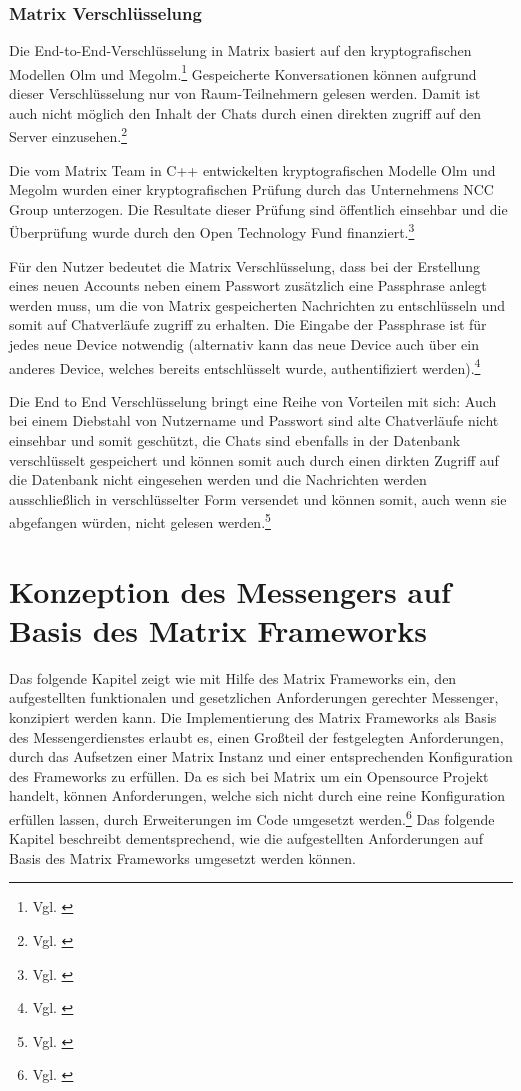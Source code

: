 \subsubsection{Matrix Verschlüsselung}\label{chapter:aemn}
Die End-to-End-Verschlüsselung in Matrix basiert auf den kryptografischen Modellen Olm und Megolm.\footnote{Vgl. \cite{Chishtie2018}}
Gespeicherte Konversationen können aufgrund dieser Verschlüsselung nur von Raum-Teilnehmern gelesen werden. Damit ist auch nicht möglich den Inhalt der Chats durch einen direkten zugriff auf den Server einzusehen.\footnote{Vgl. \cite{Nccgroup2016}}

Die vom Matrix  Team in C++ entwickelten kryptografischen Modelle Olm und Megolm  wurden einer kryptografischen Prüfung durch das Unternehmens NCC Group unterzogen. Die Resultate dieser Prüfung sind öffentlich einsehbar und die Überprüfung wurde durch den Open Technology Fund finanziert.\footnote{Vgl. \cite{Nccgroup2016}}

Für den Nutzer bedeutet die Matrix Verschlüsselung, dass bei der Erstellung eines neuen Accounts neben einem Passwort zusätzlich eine Passphrase anlegt werden muss, um die von Matrix gespeicherten Nachrichten zu entschlüsseln und somit auf Chatverläufe zugriff zu erhalten.
Die Eingabe der Passphrase ist für jedes neue Device notwendig (alternativ kann das neue Device auch über ein anderes Device, welches bereits entschlüsselt wurde, authentifiziert werden).\footnote{Vgl. \cite{Chishtie2018}}

Die End to End Verschlüsselung bringt eine Reihe von Vorteilen mit sich: Auch bei einem Diebstahl von Nutzername und Passwort sind alte Chatverläufe nicht einsehbar und somit geschützt, die Chats sind ebenfalls in der Datenbank verschlüsselt gespeichert und können somit auch durch einen dirkten Zugriff auf die Datenbank nicht eingesehen werden und die Nachrichten werden ausschließlich in verschlüsselter Form versendet und können somit, auch wenn sie abgefangen würden, nicht gelesen werden.\footnote{Vgl. \cite{Chishtie2018}}

\section{Konzeption des Messengers auf Basis des Matrix Frameworks}\label{chapter:km}
Das folgende Kapitel zeigt wie mit Hilfe des Matrix Frameworks ein, den aufgestellten funktionalen und gesetzlichen Anforderungen gerechter Messenger, konzipiert werden kann.
Die Implementierung des Matrix Frameworks als Basis des Messengerdienstes erlaubt es, einen Großteil der festgelegten Anforderungen, durch das Aufsetzen einer Matrix Instanz und einer entsprechenden Konfiguration des Frameworks zu erfüllen. Da es sich bei Matrix um ein Opensource Projekt handelt, können Anforderungen, welche sich nicht durch eine reine Konfiguration erfüllen lassen, durch Erweiterungen im Code umgesetzt werden.\footnote{Vgl. \cite{Github2020}} Das folgende Kapitel beschreibt dementsprechend, wie die aufgestellten Anforderungen auf Basis des Matrix Frameworks umgesetzt werden können.

